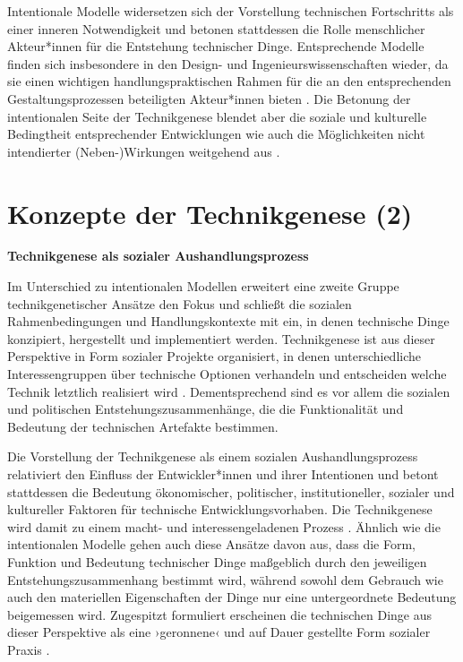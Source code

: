 \documentclass[
  a4paper,
]{book}
\begin{document}
Intentionale Modelle widersetzen sich der Vorstellung technischen Fortschritts als einer inneren Notwendigkeit und betonen stattdessen die Rolle menschlicher Akteur*innen für die Entstehung technischer Dinge. Entsprechende Modelle finden sich insbesondere in den Design- und Ingenieurswissenschaften wieder, da sie einen wichtigen handlungspraktischen Rahmen für die an den entsprechenden Gestaltungsprozessen beteiligten Akteur*innen bieten \citep{carvalhoLegitimatingDesignSociology2009}. Die Betonung der intentionalen Seite der Technikgenese blendet aber die soziale und kulturelle Bedingtheit entsprechender Entwicklungen wie auch die Möglichkeiten nicht intendierter (Neben-)Wirkungen weitgehend aus \citep{ihdeDesignerFallacyTechnological2008}.

\section{Konzepte der Technikgenese (2)}\label{konzepte-der-technikgenese-2}

\textbf{Technikgenese als sozialer Aushandlungsprozess}

Im Unterschied zu intentionalen Modellen erweitert eine zweite Gruppe technikgenetischer Ansätze den Fokus und schließt die sozialen Rahmenbedingungen und Handlungskontexte mit ein, in denen technische Dinge konzipiert, hergestellt und implementiert werden. Technikgenese ist aus dieser Perspektive in Form sozialer Projekte organisiert, in denen unterschiedliche Interessengruppen über technische Optionen verhandeln und entscheiden welche Technik letztlich realisiert wird \citep[vgl. z.B.][]{woodhouseDesignSocietyScience2004}. Dementsprechend sind es vor allem die sozialen und politischen Entstehungszusammenhänge, die die Funktionalität und Bedeutung der technischen Artefakte bestimmen.

Die Vorstellung der Technikgenese als einem sozialen Aushandlungsprozess relativiert den Einfluss der Entwickler*innen und ihrer Intentionen und betont stattdessen die Bedeutung ökonomischer, politischer, institutioneller, sozialer und kultureller Faktoren für technische Entwicklungsvorhaben. Die Technikgenese wird damit zu einem macht- und interessengeladenen Prozess \citep[vgl.][]{fengThinkingDesignCritical2008}. Ähnlich wie die intentionalen Modelle gehen auch diese Ansätze davon aus, dass die Form, Funktion und Bedeutung technischer Dinge maßgeblich durch den jeweiligen Entstehungszusammenhang bestimmt wird, während sowohl dem Gebrauch wie auch den materiellen Eigenschaften der Dinge nur eine untergeordnete Bedeutung beigemessen wird. Zugespitzt formuliert erscheinen die technischen Dinge aus dieser Perspektive als eine ›geronnene‹ und auf Dauer gestellte Form sozialer Praxis \citep{mackenzieProblematisingTechnologicalObject2005}.
\end{document}
